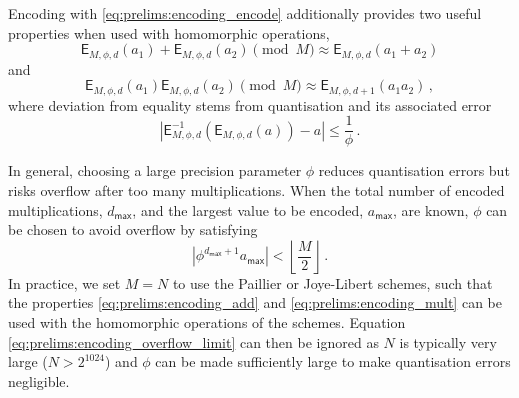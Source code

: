 Encoding with \eqref{eq:prelims:encoding_encode} additionally provides two useful properties when used with homomorphic operations,
\begin{equation}\label{eq:prelims:encoding_add}
    \mathsf{E}_{M,\phi,d}(a_1) + \mathsf{E}_{M,\phi,d}(a_2) \pmod{M} \approx \mathsf{E}_{M,\phi,d}(a_1+a_2)
\end{equation}
and
\begin{equation}\label{eq:prelims:encoding_mult}
        \mathsf{E}_{M,\phi,d}(a_1)\mathsf{E}_{M,\phi,d}(a_2) \pmod{M} \approx \mathsf{E}_{M,\phi,d+1}(a_1a_2)\,,
\end{equation}
where deviation from equality stems from quantisation and its associated error
\begin{equation}
    \left|\mathsf{E}^{-1}_{M,\phi,d}\left(\mathsf{E}_{M,\phi,d}(a)\right) - a\right| \leq \frac{1}{\phi}\,.
\end{equation}

In general, choosing a large precision parameter $\phi$ reduces quantisation errors but risks overflow after too many multiplications. When the total number of encoded multiplications, $d_{\mathsf{max}}$, and the largest value to be encoded, $a_{\mathsf{max}}$, are known, $\phi$ can be chosen to avoid overflow by satisfying
\begin{equation}\label{eq:prelims:encoding_overflow_limit}
    \left|\phi^{d_{\mathsf{max}}+1}a_{\mathsf{max}}\right| < \left\lfloor \frac{M}{2} \right\rfloor\,.
\end{equation}
In practice, we set $M=N$ to use the Paillier or Joye-Libert schemes, such that the properties \eqref{eq:prelims:encoding_add} and \eqref{eq:prelims:encoding_mult} can be used with the homomorphic operations of the schemes. Equation \eqref{eq:prelims:encoding_overflow_limit} can then be ignored as $N$ is typically very large ($N>2^{1024}$) and $\phi$ can be made sufficiently large to make quantisation errors negligible.